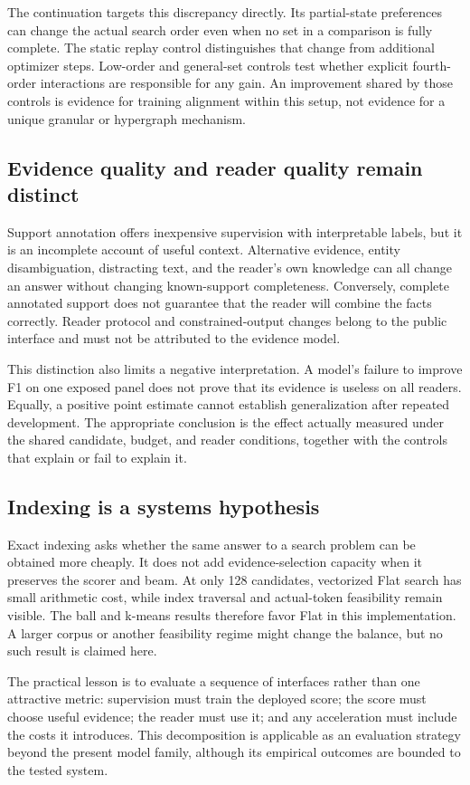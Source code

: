 \documentclass[pdflatex,sn-mathphys-num]{sn-jnl}
\begin{document}
The continuation targets this discrepancy directly. Its partial-state
preferences can change the actual search order even when no set in a
comparison is fully complete. The static replay control distinguishes that
change from additional optimizer steps. Low-order and general-set controls
test whether explicit fourth-order interactions are responsible for any
gain. An improvement shared by those controls is evidence for training
alignment within this setup, not evidence for a unique granular or
hypergraph mechanism.

\subsection{Evidence quality and reader quality remain distinct}
Support annotation offers inexpensive supervision with interpretable labels,
but it is an incomplete account of useful context. Alternative evidence,
entity disambiguation, distracting text, and the reader's own knowledge can
all change an answer without changing known-support completeness. Conversely,
complete annotated support does not guarantee that the reader will combine
the facts correctly. Reader protocol and constrained-output changes belong
to the public interface and must not be attributed to the evidence model.

This distinction also limits a negative interpretation. A model's failure
to improve F1 on one exposed panel does not prove that its evidence is
useless on all readers. Equally, a positive point estimate cannot establish
generalization after repeated development. The appropriate conclusion is
the effect actually measured under the shared candidate, budget, and reader
conditions, together with the controls that explain or fail to explain it.

\subsection{Indexing is a systems hypothesis}
Exact indexing asks whether the same answer to a search problem can be
obtained more cheaply. It does not add evidence-selection capacity when it
preserves the scorer and beam. At only 128 candidates, vectorized Flat
search has small arithmetic cost, while index traversal and actual-token
feasibility remain visible. The ball and k-means results therefore favor
Flat in this implementation. A larger corpus or another feasibility regime
might change the balance, but no such result is claimed here.

The practical lesson is to evaluate a sequence of interfaces rather than
one attractive metric: supervision must train the deployed score; the
score must choose useful evidence; the reader must use it; and any
acceleration must include the costs it introduces. This decomposition is
applicable as an evaluation strategy beyond the present model family,
although its empirical outcomes are bounded to the tested system.
\end{document}

